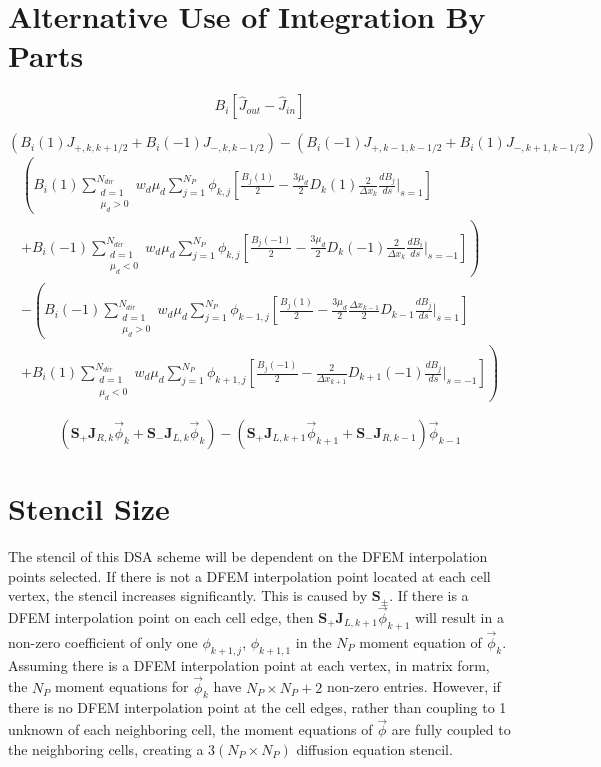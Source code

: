 \documentclass[11pt]{article}
\newcommand{\benum}{\begin{equation}}
\newcommand{\eenum}{\end{equation}}
\newcommand{\B}[1]{\ensuremath{{B_{#1} }}}
\newcommand{\p}{\ensuremath{ d}}
\begin{document}
\section{Alternative Use of Integration By Parts}

\benum
\B{i} \left[ \widehat{J}_{out} - \widehat{J}_{in} \right]
\eenum

\benum
\left( \B{i}(1)J_{+,k,k+1/2} + \B{i}(-1) J_{-,k,k-1/2} \right) - \left(\B{i}(-1)J_{+,k-1,k-1/2} + \B{i}(1) J_{-,k+1,k-1/2} \right) 
\eenum
%
%
%
\begin{multline}
\left(\B{i}(1)
 \sum_{\substack{d=1 \\ \mu_d > 0}}^{N_{dir}}{
w_d \mu_d \sum_{j=1}^{N_P}{\phi_{k,j}\left[ \frac{\B{j}(1)}{2} - \frac{3\mu_d}{2} D_k(1)\frac{2}{\Delta x_k} \frac{\p \B{j}}{\p s} \bigg \lvert_{s=1}     \right] }
} \right. \\
\left.
+ \B{i}(-1)
 \sum_{\substack{d=1 \\ \mu_d < 0}}^{N_{dir}}{
w_d \mu_d \sum_{j=1}^{N_P}{\phi_{k,j}\left[ \frac{\B{j}(-1)}{2} - \frac{3\mu_d}{2} D_k(-1)\frac{2}{\Delta x_k} \frac{\p \B{i}}{\p s} \bigg \lvert_{s=-1}      \right] }
}
 \right) \\ 
-
\left(   
\B{i}(-1)\sum_{\substack{d=1 \\ \mu_d > 0}}^{N_{dir}}{
w_d\mu_d \sum_{j=1}^{N_P}{
 \phi_{k-1,j}\left[  \frac{\B{j}(1)}{2} - \frac{3\mu_d}{2} \frac{\Delta x_{k-1}}{2}D_{k-1} \frac{\p B_j}{\p s} \bigg \lvert_{s=1} \right]
}
}
\right.
\\
\left.
+ \B{i}(1) \sum_{\substack{d=1 \\ \mu_d < 0}}^{N_{dir}}{w_d \mu_d \sum_{j=1}^{N_P}{
\phi_{k+1,j}\left[
\frac{\B{j}(-1)}{2} - \frac{2}{\Delta x_{k+1}}D_{k+1}(-1) \frac{\p \B{j}}{\p s}\bigg \lvert_{s=-1}
\right]
}
}
\right)
\end{multline}

\benum
\left( \mathbf{S}_+ \mathbf{J}_{R,k} \vec{\phi}_k + \mathbf{S}_- \mathbf{J}_{L,k} \vec{\phi}_k \right)
-
\left( \mathbf{S}_+ \mathbf{J}_{L,k+1} \vec{\phi}_{k+1} + \mathbf{S}_- \mathbf{J}_{R,k-1} \right) \vec{\phi}_{k-1}
\eenum



\section{Stencil Size}
The stencil of this DSA scheme will be dependent on the DFEM interpolation points selected.  
If there is not a DFEM interpolation point located at each cell vertex, the stencil increases significantly.  
This is caused by $\mathbf{S}_{\pm}$.  
If there is a DFEM interpolation point on each cell edge, then $\mathbf{S}_+ \mathbf{J}_{L,k+1} \vec{\phi}_{k+1}$ will result in a non-zero coefficient of only one $\phi_{k+1,j}$, $\phi_{k+1,1}$ in the $N_P$ moment equation of $\vec{\phi}_k$.  
Assuming there is a DFEM interpolation point at each vertex, in matrix form, the $N_P$ moment equations for $\vec{\phi}_k$ have $N_P \times N_P + 2$ non-zero entries.
However, if there is no DFEM interpolation point at the cell edges, rather than coupling to 1 unknown of each neighboring cell, the moment equations of $\vec{\phi}$ are fully coupled to the neighboring cells, creating a $3(N_P \times N_P)$ diffusion equation stencil.
\end{document}
